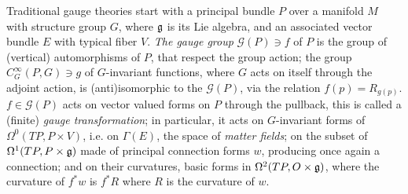 









Traditional gauge theories start with a principal bundle $P$  over a manifold $M$ with structure group $G$, where $\mathfrak{g}$ is its Lie algebra, and an associated vector bundle $E$ with typical fiber $V$. \emph{The gauge group} $\mathcal G(P) \ni f$ of $P$ is the group of (vertical) automorphisms of $P$, that respect the group action; the group $C^\infty_G(P, G) \ni g$ of $G$-invariant functions, where $G$ acts on itself through the adjoint action, is (anti)isomorphic to the $\mathcal G(P)$, via the relation $f(p) = R_{g(p)}$. $f\in \mathcal G(P)$ acts on vector valued forms on $P$ through the pullback, this is called a (finite) \emph{gauge transformation}; in particular, it acts on $G$-invariant forms of $\Omega^0(TP, P \times V)$, i.e. on $\Gamma(E)$, the space of \emph{matter fields}; on the subset of $\Omega^1(TP, P \times \mathfrak{g})$ made of principal connection forms $w$, producing once again a connection; and on their curvatures, basic forms in $\Omega^2(TP, O \times \mathfrak{g})$, where the curvature of $f^*w$ is $f^*R$ where $R$ is the curvature of $w$.


